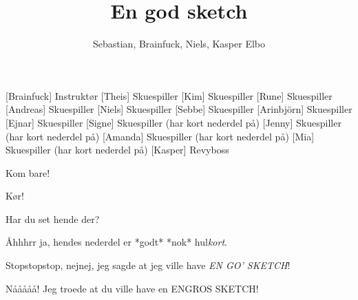 \documentclass[a4paper,11pt]{article}
\title{En god sketch}
\author{Sebastian, Brainfuck, Niels, Kasper Elbo}
\begin{document}
\maketitle

\begin{roles}
[Brainfuck] Instruktør
[Theis] Skuespiller
[Kim] Skuespiller
[Rune] Skuespiller
[Andreas] Skuespiller
[Niels] Skuespiller
[Sebbe] Skuespiller
[Arinbjörn] Skuespiller
[Ejnar] Skuespiller
[Signe] Skuespiller (har kort nederdel på)
[Jenny] Skuespiller (har kort nederdel på)
[Amanda] Skuespiller (har kort nederdel på)
[Mia] Skuespiller (har kort nederdel på)
[Kasper] Revyboss
\end{roles}



\begin{sketch}



 Kom bare!


 Kør!



 Har du set hende der?

 Åhhhrr ja, hendes nederdel er *godt* *nok* hul\emph{kort}.


 Stopstopstop, nejnej,  jeg sagde at jeg ville have \emph{EN GO' SKETCH}!

 Nååååå!  Jeg troede at du ville have en ENGROS SKETCH!


\end{sketch}
\end{document}
